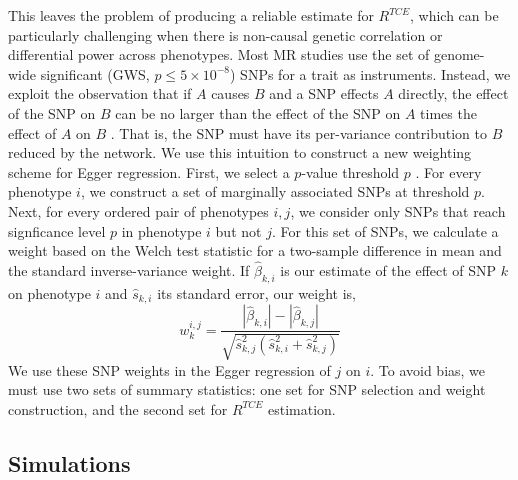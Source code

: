 \documentclass{article}
\begin{document}
This leaves the problem of producing a reliable estimate for $R^{TCE}$,
which can be particularly challenging when there is non-causal genetic correlation or
differential power across phenotypes. Most MR studies use the set of
genome-wide significant (GWS, $p \le 5\times 10^{-8}$) SNPs for a trait as instruments.
Instead, we exploit the observation that if $A$ causes $B$ and a SNP effects $A$ directly,
the effect of the SNP on $B$ can be no larger than the effect of the SNP on $A$ times
the effect of $A$ on $B$ . That is, the SNP must have its per-variance contribution to
$B$ reduced by the network. We use this intuition to construct a new
weighting scheme for Egger regression.
First, we select a $p$-value threshold $p$ . For every phenotype $i$, we
 construct a set of marginally associated SNPs at threshold $p$. Next,
 for every ordered pair of phenotypes $i, j$, we consider only SNPs that reach
 signficance level $p$ in phenotype $i$ but not $j$. For this set of SNPs, we calculate
 a weight based on the Welch test statistic for a two-sample difference in mean
 and the standard inverse-variance weight. If $\hat{\beta}_{k, i}$ is our estimate
 of the effect of SNP $k$ on phenotype $i$ and $\hat{s}_{k, i}$ its standard error,
 our weight is,
\begin{equation}
w^{i,j}_k = \frac{|\hat{\beta}_{k, i}| - |\hat{\beta}_{k, j}|}
  {\sqrt{\hat{s}_{k,j}^2 (\hat{s}^2_{k, i} + \hat{s}^2_{k, j})}}
\end{equation}
We use these SNP weights in the Egger regression of $j$ on $i$.
To avoid bias, we must use two sets of summary
statistics: one set for SNP selection and weight construction,
 and the second set for $R^{TCE}$ estimation.


\subsection{Simulations}
\end{document}
